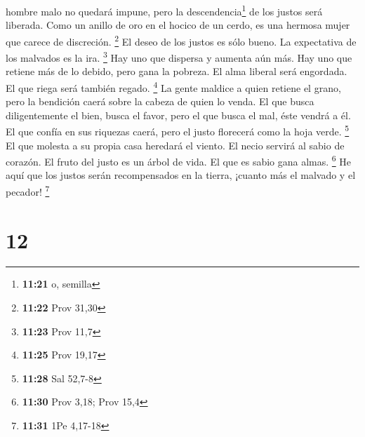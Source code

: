 hombre malo no quedará impune, pero la descendencia\footnote{\textbf{11:21}
  o, semilla} de los justos será liberada.  Como un
anillo de oro en el hocico de un cerdo, es una hermosa mujer que carece
de discreción. \footnote{\textbf{11:22} Prov 31,30}  El
deseo de los justos es sólo bueno. La expectativa de los malvados es la
ira. \footnote{\textbf{11:23} Prov 11,7}  Hay uno que
dispersa y aumenta aún más. Hay uno que retiene más de lo debido, pero
gana la pobreza.  El alma liberal será engordada. El que
riega será también regado. \footnote{\textbf{11:25} Prov 19,17}
 La gente maldice a quien retiene el grano, pero la
bendición caerá sobre la cabeza de quien lo venda.  El
que busca diligentemente el bien, busca el favor, pero el que busca el
mal, éste vendrá a él.  El que confía en sus riquezas
caerá, pero el justo florecerá como la hoja verde. \footnote{\textbf{11:28}
  Sal 52,7-8}  El que molesta a su propia casa heredará
el viento. El necio servirá al sabio de corazón.  El
fruto del justo es un árbol de vida. El que es sabio gana almas.
\footnote{\textbf{11:30} Prov 3,18; Prov 15,4}  He aquí
que los justos serán recompensados en la tierra, ¡cuanto más el malvado
y el pecador! \footnote{\textbf{11:31} 1Pe 4,17-18}

\hypertarget{section-11}{%
\section{12}\label{section-11}}

